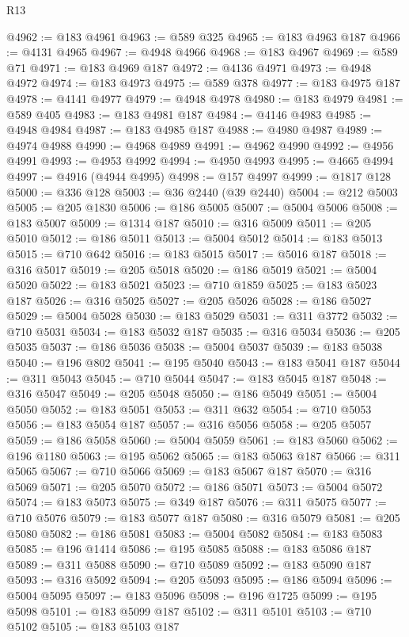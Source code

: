 \begin{lexlean}{R13}
\begin{coremodule}
@4962 := @183 @4961
@4963 := @589 @325
@4965 := @183 @4963 @187
@4966 := @4131 @4965
@4967 := @4948 @4966
@4968 := @183 @4967
@4969 := @589 @71
@4971 := @183 @4969 @187
@4972 := @4136 @4971
@4973 := @4948 @4972
@4974 := @183 @4973
@4975 := @589 @378
@4977 := @183 @4975 @187
@4978 := @4141 @4977
@4979 := @4948 @4978
@4980 := @183 @4979
@4981 := @589 @405
@4983 := @183 @4981 @187
@4984 := @4146 @4983
@4985 := @4948 @4984
@4987 := @183 @4985 @187
@4988 := @4980 @4987
@4989 := @4974 @4988
@4990 := @4968 @4989
@4991 := @4962 @4990
@4992 := @4956 @4991
@4993 := @4953 @4992
@4994 := @4950 @4993
@4995 := @4665 @4994
@4997 := @4916 (@4944 @4995)
@4998 := @157 @4997
@4999 := @1817 @128
@5000 := @336 @128
@5003 := @36 @2440 (@39 @2440)
@5004 := @212 @5003
@5005 := @205 @1830
@5006 := @186 @5005
@5007 := @5004 @5006
@5008 := @183 @5007
@5009 := @1314 @187
@5010 := @316 @5009
@5011 := @205 @5010
@5012 := @186 @5011
@5013 := @5004 @5012
@5014 := @183 @5013
@5015 := @710 @642
@5016 := @183 @5015
@5017 := @5016 @187
@5018 := @316 @5017
@5019 := @205 @5018
@5020 := @186 @5019
@5021 := @5004 @5020
@5022 := @183 @5021
@5023 := @710 @1859
@5025 := @183 @5023 @187
@5026 := @316 @5025
@5027 := @205 @5026
@5028 := @186 @5027
@5029 := @5004 @5028
@5030 := @183 @5029
@5031 := @311 @3772
@5032 := @710 @5031
@5034 := @183 @5032 @187
@5035 := @316 @5034
@5036 := @205 @5035
@5037 := @186 @5036
@5038 := @5004 @5037
@5039 := @183 @5038
@5040 := @196 @802
@5041 := @195 @5040
@5043 := @183 @5041 @187
@5044 := @311 @5043
@5045 := @710 @5044
@5047 := @183 @5045 @187
@5048 := @316 @5047
@5049 := @205 @5048
@5050 := @186 @5049
@5051 := @5004 @5050
@5052 := @183 @5051
@5053 := @311 @632
@5054 := @710 @5053
@5056 := @183 @5054 @187
@5057 := @316 @5056
@5058 := @205 @5057
@5059 := @186 @5058
@5060 := @5004 @5059
@5061 := @183 @5060
@5062 := @196 @1180
@5063 := @195 @5062
@5065 := @183 @5063 @187
@5066 := @311 @5065
@5067 := @710 @5066
@5069 := @183 @5067 @187
@5070 := @316 @5069
@5071 := @205 @5070
@5072 := @186 @5071
@5073 := @5004 @5072
@5074 := @183 @5073
@5075 := @349 @187
@5076 := @311 @5075
@5077 := @710 @5076
@5079 := @183 @5077 @187
@5080 := @316 @5079
@5081 := @205 @5080
@5082 := @186 @5081
@5083 := @5004 @5082
@5084 := @183 @5083
@5085 := @196 @1414
@5086 := @195 @5085
@5088 := @183 @5086 @187
@5089 := @311 @5088
@5090 := @710 @5089
@5092 := @183 @5090 @187
@5093 := @316 @5092
@5094 := @205 @5093
@5095 := @186 @5094
@5096 := @5004 @5095
@5097 := @183 @5096
@5098 := @196 @1725
@5099 := @195 @5098
@5101 := @183 @5099 @187
@5102 := @311 @5101
@5103 := @710 @5102
@5105 := @183 @5103 @187

\end{coremodule}
\end{lexlean}

